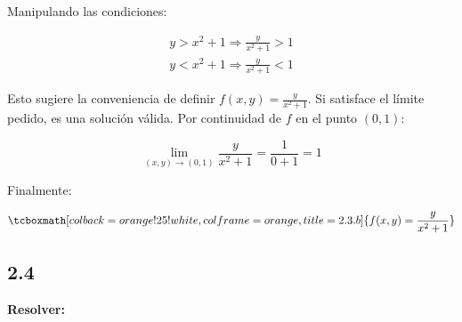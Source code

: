 \documentclass{article}
\begin{document}
Manipulando las condiciones:

\begin{align}
y > x^2 + 1 \Rightarrow \frac{y}{x^2 + 1} > 1 \\
y < x^2 + 1 \Rightarrow \frac{y}{x^2 + 1} < 1
\end{align}

Esto sugiere la conveniencia de definir $f(x,y) = \frac{y}{x^2+1}$. Si satisface el límite pedido, es una solución válida.
Por continuidad de $f$ en el punto $(0, 1)$:

\begin{equation}
\lim_{(x,y) \rightarrow (0,1)} \frac{y}{x^2 + 1} = \frac{1}{0+1} = 1
\end{equation}

Finalmente:

\begin{equation}
\tcboxmath[colback=orange!25!white,colframe=orange,title=2.3.b]
{ f(x,y) = \frac{y}{x^2 + 1} }
\end{equation}

\subsection*{2.4}
\label{subsec:2.4}

\textbf{Resolver:} 
\end{document}
